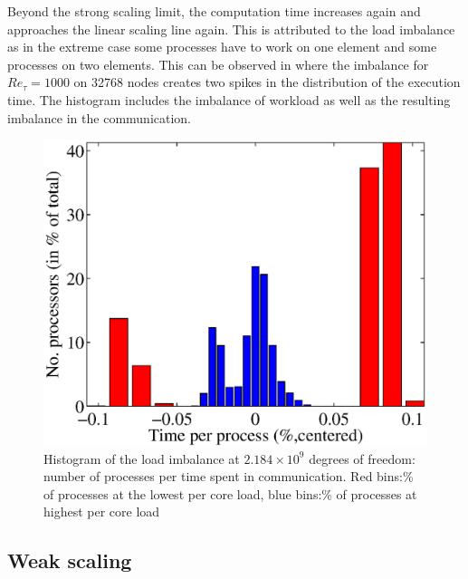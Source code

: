 \documentclass{sig-alternate}
\begin{document}
Beyond the strong scaling limit, the computation time increases again and
approaches the linear scaling line again. This is attributed to the load
imbalance as in the extreme case some processes have to work on one element and
some processes on two elements. This can be observed in
where the imbalance for $Re_{\tau}=1000$ on 32768 nodes creates two spikes in the
distribution of the execution time. The histogram includes the imbalance of
workload as well as the resulting imbalance in the communication.
\begin{figure}
  \centering
  \includegraphics[width=\linewidth]{./figures/loadbalance.eps}
  \caption{Histogram of the load imbalance at $2.184\times10^9$ degrees of freedom: number of processes per time spent in communication. Red bins:\% of processes at the lowest per core load, blue bins:\% of processes at highest per core load}
  \label{fig:imbalancehist}
\end{figure}

\subsection{Weak scaling}
\end{document}
